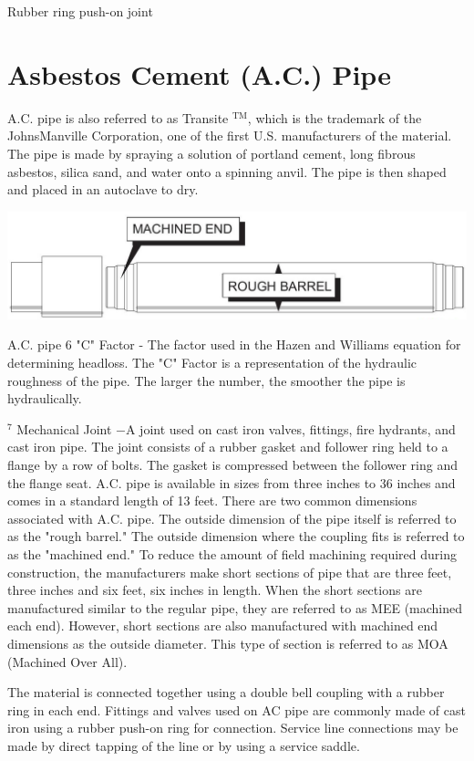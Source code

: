 \documentclass[10pt]{article}
\begin{document}
Rubber ring push-on joint

\section{Asbestos Cement (A.C.) Pipe}
A.C. pipe is also referred to as Transite ${ }^{\mathrm{TM}}$, which is the trademark of the JohnsManville Corporation, one of the first U.S. manufacturers of the material. The pipe is made by spraying a solution of portland cement, long fibrous asbestos, silica sand, and water onto a spinning anvil. The pipe is then shaped and placed in an autoclave to dry.

\includegraphics[max width=\textwidth]{2022_11_03_fc0cbc2f3612fab6edd2g-05(2)}

A.C. pipe 6 "C" Factor - The factor used in the Hazen and Williams equation for determining headloss. The "C" Factor is a representation of the hydraulic roughness of the pipe. The larger the number, the smoother the pipe is hydraulically.

${ }^{7}$ Mechanical Joint $-\mathrm{A}$ joint used on cast iron valves, fittings, fire hydrants, and cast iron pipe. The joint consists of a rubber gasket and follower ring held to a flange by a row of bolts. The gasket is compressed between the follower ring and the flange seat. A.C. pipe is available in sizes from three inches to 36 inches and comes in a standard length of 13 feet. There are two common dimensions associated with A.C. pipe. The outside dimension of the pipe itself is referred to as the "rough barrel." The outside dimension where the coupling fits is referred to as the "machined end." To reduce the amount of field machining required during construction, the manufacturers make short sections of pipe that are three feet, three inches and six feet, six inches in length. When the short sections are manufactured similar to the regular pipe, they are referred to as MEE (machined each end). However, short sections are also manufactured with machined end dimensions as the outside diameter. This type of section is referred to as MOA (Machined Over All).

The material is connected together using a double bell coupling with a rubber ring in each end. Fittings and valves used on AC pipe are commonly made of cast iron using a rubber push-on ring for connection. Service line connections may be made by direct tapping of the line or by using a service saddle.
\end{document}
